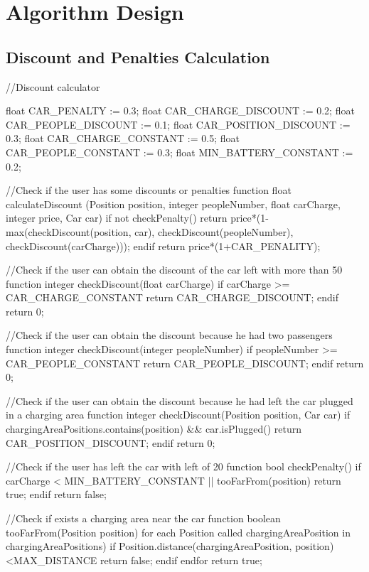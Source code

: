 \documentclass[11pt,a4paper]{report}
\begin{document}
\chapter{Algorithm Design}
\section{Discount and Penalties Calculation}
\begin{pseudocodeEnv}
//Discount calculator

float CAR_PENALTY := 0.3;
float CAR_CHARGE_DISCOUNT := 0.2;
float CAR_PEOPLE_DISCOUNT := 0.1;
float CAR_POSITION_DISCOUNT := 0.3;
float CAR_CHARGE_CONSTANT := 0.5;
float CAR_PEOPLE_CONSTANT := 0.3;
float MIN_BATTERY_CONSTANT := 0.2;

//Check if the user has some discounts or penalties
function float calculateDiscount (Position position, integer peopleNumber, float carCharge, integer price, Car car){
	if not checkPenalty()
		return price*(1-max(checkDiscount(position, car), checkDiscount(peopleNumber), checkDiscount(carCharge)));
	endif
	return price*(1+CAR_PENALITY);
}

//Check if the user can obtain the discount of the car left with more than 50%
function integer checkDiscount(float carCharge){
	if carCharge >= CAR_CHARGE_CONSTANT
		return CAR_CHARGE_DISCOUNT;
	endif
	return 0;
}

//Check if the user can obtain the discount because he had two passengers
function integer checkDiscount(integer peopleNumber){
	if peopleNumber >= CAR_PEOPLE_CONSTANT
		return CAR_PEOPLE_DISCOUNT;
	endif
	return 0;
}

//Check if the user can obtain the discount because he had left the car plugged in a charging area
function integer checkDiscount(Position position, Car car){
	if chargingAreaPositions.contains(position) && car.isPlugged()
		return CAR_POSITION_DISCOUNT;
	endif
	return 0;
}

//Check if the user has left the car with left of 20%
function bool checkPenalty(){
	if carCharge < MIN_BATTERY_CONSTANT || tooFarFrom(position)
		return true;
	endif
	return false;
}

//Check if exists a charging area near the car
function boolean tooFarFrom(Position position){
	for each Position called chargingAreaPosition in chargingAreaPositions)
		if Position.distance(chargingAreaPosition, position)<MAX_DISTANCE
			return false;
		endif
	endfor
	return true;
}
\end{pseudocodeEnv}
\end{document}
